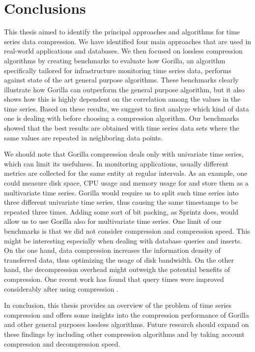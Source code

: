 
\chapter*{Conclusions}
This thesis aimed to identify the principal approaches and algorithms for time series data compression.
We have identified four main approaches that are used in real-world applications and databases.
We then focused on lossless compression algorithms by creating benchmarks to evaluate how Gorilla,
an algorithm specifically tailored for infrastructure monitoring time series data, performs against
state of the art general purpose algorithms. 
These benchmarks clearly illustrate how Gorilla can outperform the general purpose algorithm, but it
also shows how this is highly dependent on the correlation among the values in the time series.
Based on these results, we suggest to first analyze which kind of data one is dealing with before choosing
a compression algorithm. Our benchmarks showed that the best results are obtained with time series data sets where
the same values are repeated in neighboring data points.

We should note that Gorilla compression deals only with univariate time series, which can limit
its usefulness. In monitoring applications, usually different metrics are collected for the
same entity at regular intervals. As an example, one could measure disk space, CPU usage and memory usage
for and store them as a multivariate time series. Gorilla would require us to split such time series into
three different univariate time series, thus causing the same timestamps to be repeated three times.
Adding some sort of bit packing, as Sprintz does, would allow us to use Gorilla also for multivariate time series.
One limit of our benchmarks is that we did not consider compression and compression speed.
This might be interesting especially when dealing with database queries and inserts. On the one hand,
data compression increases the information density of transferred data, thus
optimizing the usage of disk bandwidth. On the other hand, the decompression overhead might outweigh the potential
benefits of compression. One recent work has found that query times were improved
considerably after using compression \cite{burman2017implementing}.

In conclusion, this thesis provides an overview of the problem of time series compression and offers some insights
into the compression performance of Gorilla and other general purposes lossless algorithms. Future research should expand
on these findings by including other compression algorithms and by taking account compression and
decompression speed.

